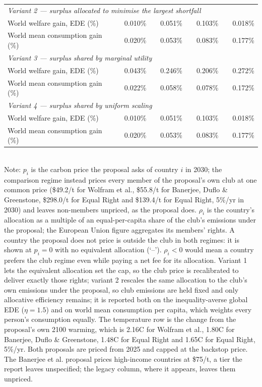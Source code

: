 \begin{table}[htbp]
\begin{tabular}{lcccccccc}
  \midrule
  \multicolumn{9}{l}{\textit{Variant 2 --- surplus allocated to minimise the largest shortfall}} \\
  \quad World welfare gain, EDE (\%) &  & 0.010\% &  & 0.051\% &  & 0.103\% &  & 0.018\% \\
  \quad World mean consumption gain (\%) &  & 0.020\% &  & 0.053\% &  & 0.083\% &  & 0.177\% \\
  \midrule
  \multicolumn{9}{l}{\textit{Variant 3 --- surplus shared by marginal utility}} \\
  \quad World welfare gain, EDE (\%) &  & 0.043\% &  & 0.246\% &  & 0.206\% &  & 0.272\% \\
  \quad World mean consumption gain (\%) &  & 0.022\% &  & 0.058\% &  & 0.078\% &  & 0.172\% \\
  \midrule
  \multicolumn{9}{l}{\textit{Variant 4 --- surplus shared by uniform scaling}} \\
  \quad World welfare gain, EDE (\%) &  & 0.010\% &  & 0.051\% &  & 0.103\% &  & 0.018\% \\
  \quad World mean consumption gain (\%) &  & 0.020\% &  & 0.053\% &  & 0.083\% &  & 0.177\% \\
  \bottomrule
\end{tabular}
\label{tab:equiv_rights_A}
\\[4pt]
{\footnotesize Note: $p_i$ is the carbon price the proposal asks of country $i$ in 2030; the comparison regime instead prices every member of the proposal's own club at one common price (\$49.2/t for Wolfram et al., \$55.8/t for Banerjee, Duflo \& Greenstone, \$298.0/t for Equal Right and \$139.4/t for Equal Right, 5\%/yr in 2030) and leaves non-members unpriced, as the proposal does. $\rho_i$ is the country's allocation as a multiple of an equal-per-capita share of the club's emissions under the proposal; the European Union figure aggregates its members' rights. A country the proposal does not price is outside the club in both regimes: it is shown at $p_i=0$ with no equivalent allocation (`--'). $\rho_i < 0$ would mean a country prefers the club regime even while paying a net fee for its allocation. Variant 1 lets the equivalent allocation set the cap, so the club price is recalibrated to deliver exactly those rights; variant 2 rescales the same allocation to the club's own emissions under the proposal, so club emissions are held fixed and only allocative efficiency remains; it is reported both on the inequality-averse global EDE ($\eta=1.5$) and on world mean consumption per capita, which weights every person's consumption equally. The temperature row is the change from the proposal's own 2100 warming, which is 2.16\textdegree{}C for Wolfram et al., 1.80\textdegree{}C for Banerjee, Duflo \& Greenstone, 1.48\textdegree{}C for Equal Right and 1.65\textdegree{}C for Equal Right, 5\%/yr. Both proposals are priced from 2025 and capped at the backstop price. The Banerjee et al. proposal prices high-income countries at \$75/t, a tier the report leaves unspecified; the legacy column, where it appears, leaves them unpriced.}
\end{table}
